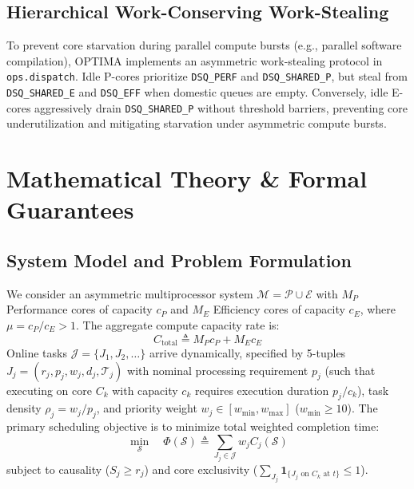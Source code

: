\documentclass[conference]{IEEEtran}
\begin{document}
\subsection{Hierarchical Work-Conserving Work-Stealing}
To prevent core starvation during parallel compute bursts (e.g., parallel software compilation), OPTIMA implements an asymmetric work-stealing protocol in \texttt{ops.dispatch}. Idle P-cores prioritize \texttt{DSQ\_PERF} and \texttt{DSQ\_SHARED\_P}, but steal from \texttt{DSQ\_SHARED\_E} and \texttt{DSQ\_EFF} when domestic queues are empty. Conversely, idle E-cores aggressively drain \texttt{DSQ\_SHARED\_P} without threshold barriers, preventing core underutilization and mitigating starvation under asymmetric compute bursts.

\section{Mathematical Theory \& Formal Guarantees}
\label{sec:theory}

\subsection{System Model and Problem Formulation}
We consider an asymmetric multiprocessor system $\mathcal{M} = \mathcal{P} \cup \mathcal{E}$ with $M_P$ Performance cores of capacity $c_P$ and $M_E$ Efficiency cores of capacity $c_E$, where $\mu = c_P / c_E > 1$. The aggregate compute capacity rate is:
\begin{equation}
C_{\mathrm{total}} \triangleq M_P c_P + M_E c_E
\end{equation}
Online tasks $\mathcal{J} = \{J_1, J_2, \dots\}$ arrive dynamically, specified by 5-tuples $J_j = (r_j, p_j, w_j, d_j, \mathcal{T}_j)$ with nominal processing requirement $p_j$ (such that executing on core $C_k$ with capacity $c_k$ requires execution duration $p_j / c_k$), task density $\rho_j = w_j / p_j$, and priority weight $w_j \in [w_{\min}, w_{\max}]$ ($w_{\min} \ge 10$). The primary scheduling objective is to minimize total weighted completion time:
\begin{equation}
\min_{\mathcal{S}} \quad \Phi(\mathcal{S}) \triangleq \sum_{J_j \in \mathcal{J}} w_j C_j(\mathcal{S})
\end{equation}
subject to causality ($S_j \ge r_j$) and core exclusivity ($\sum_{J_j} \mathbf{1}_{\{J_j \text{ on } C_k \text{ at } t\}} \le 1$).
\end{document}
